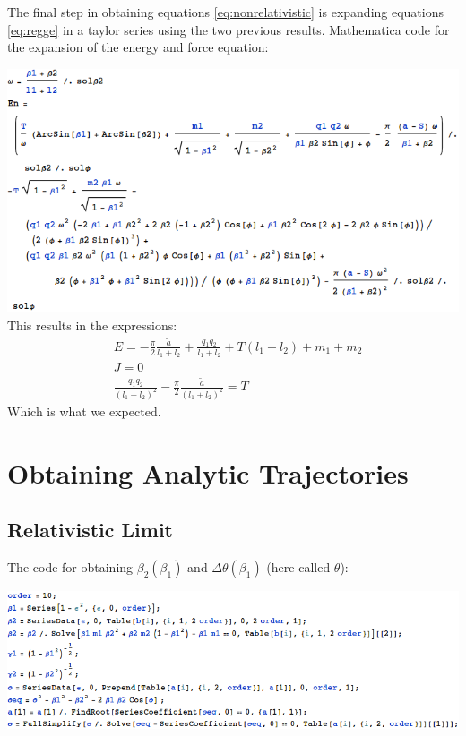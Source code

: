 \documentclass[11pt,a4paper]{article}
\begin{document}
The final step in obtaining equations \ref{eq:nonrelativistic} is expanding equations \ref{eq:regge} in a taylor series using the two previous results. Mathematica code for the expansion of the energy and force equation:

\includegraphics[width=\linewidth]{figures/nonrelativisticeq.png}
This results in the expressions:
\begin{subequations}
\begin{align}
&E=-\frac{\pi}{2}\frac{\tilde{a}}{l_1+l_2}+\frac{q_1 q_2}{l_1+l_2}+T (l_1+l_2)+m_1+m_2\\
&J=0\\
&\frac{q_1 q_2}{(l_1+l_2)^2}-\frac{\pi}{2}\frac{\tilde{a}}{(l_1+l_2)^2}=T
\end{align}
\end{subequations}
Which is what we expected.
\FloatBarrier
\section{Obtaining Analytic Trajectories}
\label{sec:analytic}
\subsection{Relativistic Limit}
The code for obtaining $\beta_2\left(\beta_1\right)$ and $\Delta\theta\left(\beta_1\right)$ (here called $\theta$):

\includegraphics[width=\linewidth]{figures/AnalyticRelativisticKin}
\end{document}
